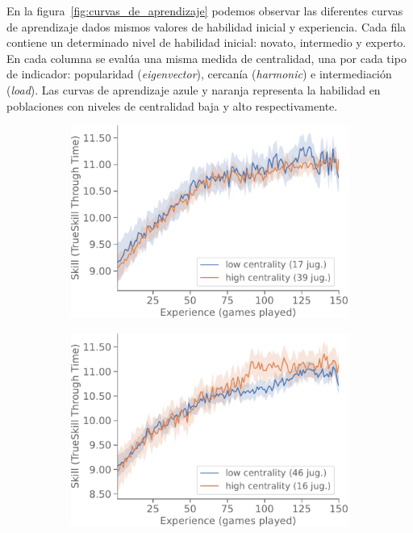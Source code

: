 \documentclass[a4paper,11pt]{book}
\theoremstyle{definition}
\begin{document}
En la figura~\ref{fig:curvas_de_aprendizaje} podemos observar las diferentes curvas de aprendizaje dados mismos valores de habilidad inicial y experiencia.
%
Cada fila contiene un determinado nivel de habilidad inicial: novato, intermedio y experto.
%
En cada columna se evalúa una misma medida de centralidad, una por cada tipo de indicador: popularidad (\emph{eigenvector}), cercanía (\emph{harmonic}) e intermediación (\emph{load}).
%
Las curvas de aprendizaje azule y naranja representa la habilidad en poblaciones con niveles de centralidad baja y alto respectivamente.
%
\begin{figure}[ht!]
    \centering
	\begin{subfigure}[t]{0.32\textwidth}\centering
	\includegraphics[width=\linewidth]{static/paper/evolucion-ttt-inicial-low-eigenvector-centrality}
	\end{subfigure}
	\begin{subfigure}[t]{0.32\textwidth}\centering
	\includegraphics[width=\linewidth]{static/paper/evolucion-ttt-inicial-low-harmonic-centrality-inverse-weight}

\end{subfigure}
\end{figure}
\end{document}
